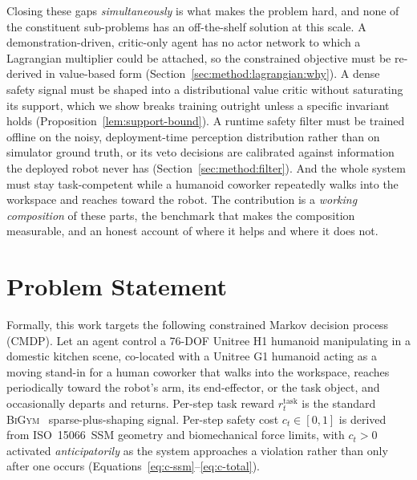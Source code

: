 \documentclass[11pt,a4paper]{report}
\newcommand{\ssm}{SSM}
\newcommand{\iso}{ISO~15066}
\newcommand{\bigym}{\textsc{BiGym}}
\begin{document}
Closing these gaps \emph{simultaneously} is what makes the problem
hard, and none of the constituent sub-problems has an off-the-shelf
solution at this scale. A demonstration-driven, critic-only agent has
no actor network to which a Lagrangian multiplier could be attached,
so the constrained objective must be re-derived in value-based form
(Section~\ref{sec:method:lagrangian:why}). A dense safety signal must
be shaped into a distributional value critic without saturating its
support, which we show breaks training outright unless a specific
invariant holds (Proposition~\ref{lem:support-bound}). A runtime safety
filter must be trained offline on the noisy, deployment-time
perception distribution rather than on simulator ground truth, or its
veto decisions are calibrated against information the deployed robot
never has (Section~\ref{sec:method:filter}). And the whole system must
stay task-competent while a humanoid coworker repeatedly walks into
the workspace and reaches toward the robot. The contribution is a
\emph{working composition} of these parts, the benchmark that makes
the composition measurable, and an honest account of where it helps
and where it does not.

\section{Problem Statement}
\label{sec:intro:problem}

Formally, this work targets the following constrained Markov
decision process (CMDP). Let an agent control a 76-DOF Unitree H1
humanoid manipulating in a domestic kitchen scene, co-located with a
Unitree G1 humanoid acting as a moving stand-in for a human coworker that walks
into the workspace, reaches periodically toward the robot's arm,
its end-effector, or the task object, and occasionally departs and
returns. Per-step task reward $r^{\mathrm{task}}_t$ is the standard
\bigym{}~\cite{chernyadev2024bigym} sparse-plus-shaping signal.
Per-step safety cost $c_t \in [0,1]$ is derived from \iso{}~\ssm{}
geometry and biomechanical force limits, with $c_t > 0$ activated
\emph{anticipatorily} as the system approaches a violation rather
than only after one occurs (Equations~\ref{eq:c-ssm}--\ref{eq:c-total}).
\end{document}
